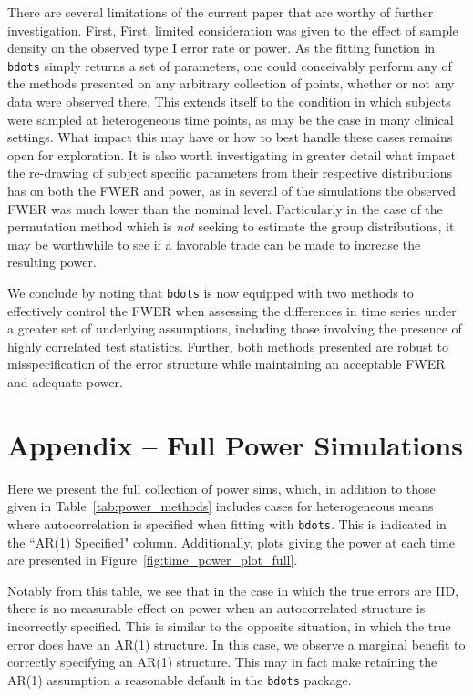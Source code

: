 \documentclass{article}
\newcommand{\xt}{\texttt}
\begin{document}
There are several limitations of the current paper that are worthy of further investigation. First, First, limited consideration was given to the effect of sample density on the observed type I error rate or power. As the fitting function in \xt{bdots} simply returns a set of parameters, one could conceivably perform any of the methods presented on any arbitrary collection of points, whether or not any data were observed there. This extends itself to the condition in which subjects were sampled at heterogeneous time points, as may be the case in many clinical settings. What impact this may have or how to best handle these cases remains open for exploration. It is also worth investigating in greater detail what impact the re-drawing of subject specific parameters from their respective distributions has on both the FWER and power, as in several of the simulations the observed FWER was much lower than the nominal level. Particularly in the case of the permutation method which is \textit{not} seeking to estimate the group distributions, it may be worthwhile to see if a favorable trade can be made to increase the resulting power.

We conclude by noting that \xt{bdots} is now equipped with two methods to effectively control the FWER when assessing the differences in time series under a greater set of underlying assumptions, including those involving the presence of highly correlated test statistics. Further, both methods presented are robust to misspecification of the error structure while maintaining an acceptable FWER and adequate power. 

\section{Appendix -- Full Power Simulations}

Here we present the full collection of power sims, which, in addition to those given in Table~\ref{tab:power_methods} includes cases for heterogeneous means where autocorrelation is specified when fitting with \xt{bdots}. This is indicated in the ``AR(1) Specified" column. Additionally, plots giving the power at each time are presented in Figure~\ref{fig:time_power_plot_full}.

Notably from this table, we see that in the case in which the true errors are IID, there is no measurable effect on power when an autocorrelated structure is incorrectly specified.  This is similar to the opposite situation, in which the true error does have an AR(1) structure. In this case, we observe a marginal benefit to correctly specifying an AR(1) structure. This may in fact make retaining the AR(1) assumption a reasonable default in the \xt{bdots} package.
\end{document}
